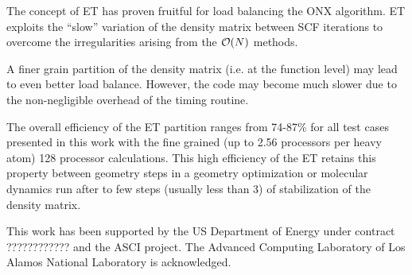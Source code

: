 \documentclass[prl,twocolumn,showpacs,twocolumngrid,superbib]{revtex4}
\begin{document}
 The concept of ET has proven fruitful for load balancing the ONX 
 algorithm. ET exploits the ``slow'' variation of the density matrix 
 between SCF iterations to overcome the irregularities arising 
 from the ${\cal O}(N)$ methods.

 A finer grain partition of the density matrix (i.e. at the function level)
 may lead to even better load balance. However, the code 
 may become much slower due to the non-negligible overhead 
 of the timing routine.

 The overall efficiency of the ET partition ranges from 74-87\%
 for all test cases presented in this work with the fine grained
 (up to 2.56 processors per heavy atom) 128 processor calculations.
 This high efficiency of the ET retains this property between geometry steps
 in a geometry optimization or molecular dynamics run after
 to few steps (usually less than 3) of stabilization of the density matrix.

\begin{acknowledgments}
 This work has been supported by the US Department of Energy
 under contract ???????????? and the ASCI project.
 The Advanced Computing Laboratory of Los
 Alamos National Laboratory is acknowledged.
\end{acknowledgments}

%
\newpage


\end{document}
